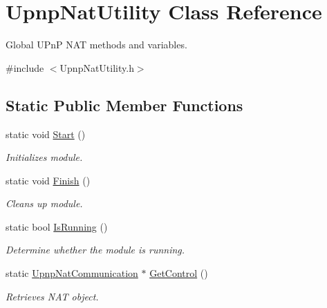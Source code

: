 \hypertarget{class_upnp_nat_utility}{
\section{UpnpNatUtility Class Reference}
\label{class_upnp_nat_utility}
}


Global UPnP NAT methods and variables.  




{\ttfamily \#include $<$UpnpNatUtility.h$>$}

\subsection*{Static Public Member Functions}
\begin{DoxyCompactItemize}
\item 
\hypertarget{class_upnp_nat_utility_af5316f831b786fa889040d14143b257a}{
static void \hyperlink{class_upnp_nat_utility_af5316f831b786fa889040d14143b257a}{Start} ()}
\label{class_upnp_nat_utility_af5316f831b786fa889040d14143b257a}

\begin{DoxyCompactList}\small\item\em Initializes module. \item\end{DoxyCompactList}\item 
\hypertarget{class_upnp_nat_utility_a2a2b1f01742de357837ccb020789a1e6}{
static void \hyperlink{class_upnp_nat_utility_a2a2b1f01742de357837ccb020789a1e6}{Finish} ()}
\label{class_upnp_nat_utility_a2a2b1f01742de357837ccb020789a1e6}

\begin{DoxyCompactList}\small\item\em Cleans up module. \item\end{DoxyCompactList}\item 
static bool \hyperlink{class_upnp_nat_utility_ae9012a08fced54432da46aea98e78546}{IsRunning} ()
\begin{DoxyCompactList}\small\item\em Determine whether the module is running. \item\end{DoxyCompactList}\item 
static \hyperlink{class_upnp_nat_communication}{UpnpNatCommunication} $\ast$ \hyperlink{class_upnp_nat_utility_ad8d771493e18e4e021d34300017e1a61}{GetControl} ()
\begin{DoxyCompactList}\small\item\em Retrieves NAT object. \item\end{DoxyCompactList}\end{DoxyCompactItemize}

